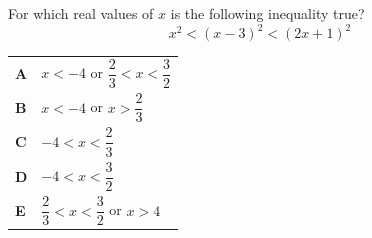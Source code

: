 \documentclass[11pt,a4paper]{article}
\begin{document}
\thispagestyle{djspaper}
\djsFrontMatter
\thispagestyle{djspaper}
\vspace*{8pt}
\begin{enumerate}[label=\textbf{\arabic*.},leftmargin=*,itemsep=0pt,start=1]
\questionitem[Inequalities]
For which real values of $x$ is the following inequality true?
\[
x^2<(x-3)^2<(2x+1)^2
\]

\par\vspace*{12pt}
\begin{tabularx}{\linewidth}{@{}>{\bfseries}l Y@{}}
A &
$x<-4$ or $\dfrac{2}{3}<x<\dfrac{3}{2}$
\\[0.8em]
B &
$x<-4$ or $x>\dfrac{2}{3}$
\\[0.8em]
C &
$-4<x<\dfrac{2}{3}$
\\[0.8em]
D &
$-4<x<\dfrac{3}{2}$
\\[0.8em]
E &
$\dfrac{2}{3}<x<\dfrac{3}{2}$ or $x>4$
\\
\end{tabularx}
\end{enumerate}
\clearpage
\thispagestyle{djspaper}
\vspace*{8pt}
\end{document}
